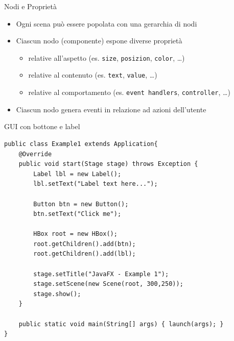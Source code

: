 \documentclass[presentation]{beamer}
\begin{document}
\begin{frame}{Nodi e Proprietà}
\begin{itemize}\itemsep10pt
\item Ogni scena può essere popolata con una gerarchia di nodi
\item Ciascun nodo (componente) espone diverse proprietà
\begin{itemize}
\item relative all'aspetto (es. \texttt{size}, \texttt{posizion}, \texttt{color}, \dots)
\item relative al contenuto (es. \texttt{text}, \texttt{value}, \dots)
\item relative al comportamento (es. \texttt{event handlers}, \texttt{controller}, \dots)
\end{itemize}
\item Ciascun nodo genera eventi in relazione ad azioni dell'utente
\end{itemize}
\end{frame}

\begin{frame}[fragile]{GUI con bottone e label}
\begin{lstlisting}
public class Example1 extends Application{
	@Override
	public void start(Stage stage) throws Exception {
		Label lbl = new Label();
		lbl.setText("Label text here...");

		Button btn = new Button();
		btn.setText("Click me");

		HBox root = new HBox();
		root.getChildren().add(btn);
		root.getChildren().add(lbl);

		stage.setTitle("JavaFX - Example 1");
		stage.setScene(new Scene(root, 300,250));
		stage.show();
	}

	public static void main(String[] args) { launch(args); }
}
\end{lstlisting}
\end{frame}
\end{document}
